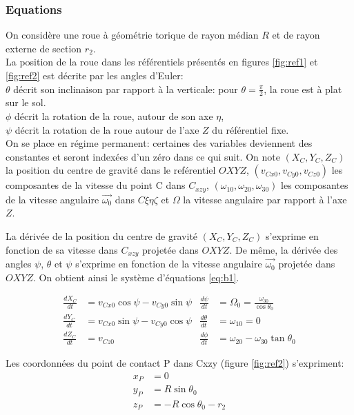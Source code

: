 \subsubsection{Equations}
On considère une roue à géométrie torique de rayon médian $R$ et de rayon externe de section $r_2$.\\
La position de la roue dans les référentiels présentés en figures \ref{fig:ref1} et \ref{fig:ref2} est décrite par les angles d'Euler: \\
$\theta$ décrit son inclinaison par rapport à la verticale: pour $\theta=\frac{\pi}{2}$, la roue est à plat sur le sol. \\
$\phi$ décrit la rotation de la roue, autour de son axe $\eta$, \\
$\psi$ décrit la rotation de la roue autour de l'axe $Z$ du référentiel fixe. \\

On se place en régime permanent: certaines des variables deviennent des constantes et seront indexées d'un zéro dans ce qui suit.
On note $(X_C,Y_C,Z_C)$ la position du centre de gravité dans le reférentiel $OXYZ$, $(v_{Cx0},v_{Cy0},v_{Cz0})$ les composantes de la vitesse du point C dans $C_{xzy}$, $(\omega_{10},\omega_{20},\omega_{30})$ les composantes de la vitesse angulaire $\vec{\omega_0}$ dans $C{\xi \eta \zeta}$ et $\Omega$ la vitesse angulaire par rapport à l'axe $Z$.

La dérivée de la position du centre de gravité $(X_C,Y_C,Z_C)$ s'exprime en fonction de sa vitesse dans $C_{xzy}$ projetée dans $OXYZ$. De même, la dérivée des angles $\psi$, $\theta$ et $\psi$ s'exprime en fonction de la vitesse angulaire $\vec{\omega_0}$ projetée dans $OXYZ$. On obtient ainsi le système d'équations \ref{eq:b1}.

 \begin{align} 
    \frac{dX_C}{dt} &=v_{Cx0} \cos{\psi}- v_{Cy0} \sin{\psi}  & \frac{d\psi}{dt}&=\Omega_0=\frac{\omega_{30}}{\cos{\theta_0}} \nonumber\\
    \frac{dY_C}{dt} &=v_{Cx0} \sin{\psi}- v_{Cy0} \cos{\psi} & \frac{d\theta}{dt}&=\omega_{10}=0 \nonumber\\
    \frac{dZ_C}{dt} &=v_{Cz0} & \frac{d\phi}{dt}&=\omega_{20}-\omega_{30} \tan{\theta_0}
    \label{eq:b1}
\end{align}



Les coordonnées du point de contact P dans C{xzy} (figure \ref{fig:ref2}) s'expriment:
\begin{align}
    x_P&=0 \nonumber\\
    y_P&=R\sin{\theta_0} \nonumber\\
    z_P&=-R\cos{\theta_0}-r_2
  \label{eq:b2}
\end{align}

